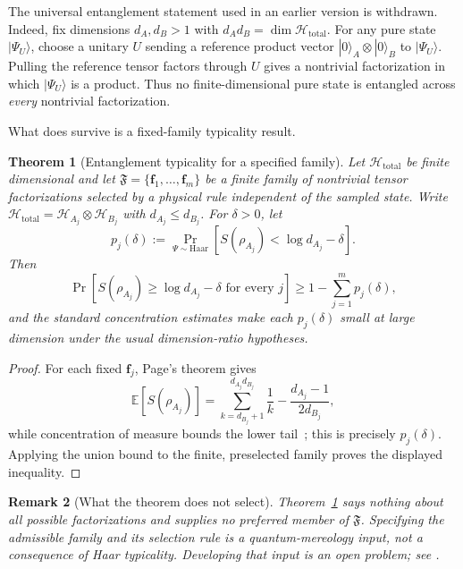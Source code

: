 \documentclass[12pt,a4paper]{article}
\newtheorem{theorem}{Theorem}[section]
\newtheorem{remark}[theorem]{Remark}
\begin{document}
The universal entanglement statement used in an earlier version is withdrawn.  Indeed, fix dimensions $d_A,d_B>1$ with $d_Ad_B=\dim\mathcal H_{\mathrm{total}}$.  For any pure state $|\Psi_U\rangle$, choose a unitary $U$ sending a reference product vector $|0\rangle_A\otimes|0\rangle_B$ to $|\Psi_U\rangle$.  Pulling the reference tensor factors through $U$ gives a nontrivial factorization in which $|\Psi_U\rangle$ is a product.  Thus no finite-dimensional pure state is entangled across \emph{every} nontrivial factorization.

What does survive is a fixed-family typicality result.

\begin{theorem}[Entanglement typicality for a specified family]
\label{thm:nofact}
Let $\mathcal H_{\mathrm{total}}$ be finite dimensional and let
$\mathfrak F=\{\mathbf f_1,\ldots,\mathbf f_m\}$ be a finite family of
nontrivial tensor factorizations selected by a physical rule independent
of the sampled state.  Write
$\mathcal H_{\mathrm{total}}=\mathcal H_{A_j}\otimes\mathcal H_{B_j}$
with $d_{A_j}\le d_{B_j}$.  For $\delta>0$, let
\[
p_j(\delta):=
\Pr_{\Psi\sim\mathrm{Haar}}
\left[S(\rho_{A_j})<\log d_{A_j}-\delta\right].
\]
Then
\[
\Pr\left[
S(\rho_{A_j})\ge\log d_{A_j}-\delta
\text{ for every }j
\right]
\ge 1-\sum_{j=1}^m p_j(\delta),
\]
and the standard concentration estimates make each $p_j(\delta)$ small
at large dimension under the usual dimension-ratio hypotheses.
\end{theorem}

\begin{proof}
For each fixed $\mathbf f_j$, Page's theorem gives~\cite{Page1993}
\begin{equation}
\label{eq:page}
\mathbb{E}[S(\rho_{A_j})]
=\sum_{k=d_{B_j}+1}^{d_{A_j}d_{B_j}}\frac1k
-\frac{d_{A_j}-1}{2d_{B_j}},
\end{equation}
while concentration of measure bounds the lower tail~\cite{HaydenLeungWinter2006}; this is precisely $p_j(\delta)$.  Applying the union bound to the finite, preselected family proves the displayed inequality.
\end{proof}

\begin{remark}[What the theorem does not select]
Theorem~\ref{thm:nofact} says nothing about all possible factorizations and supplies no preferred member of $\mathfrak F$.  Specifying the admissible family and its selection rule is a quantum-mereology input, not a consequence of Haar typicality.  Developing that input is an open problem; see \cite{Cotler2019,CarrollSingh2021}.
\end{remark}
\end{document}

